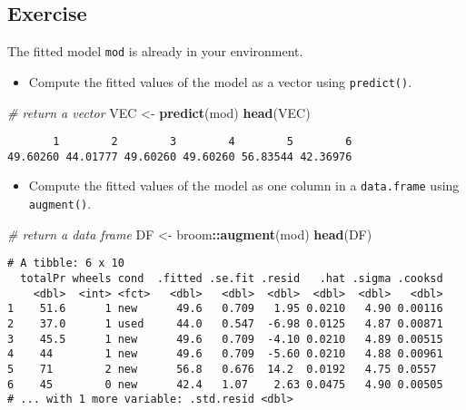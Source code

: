 \documentclass[]{book}
\newenvironment{Shaded}{\begin{snugshade}}{\end{snugshade}}
\newcommand{\KeywordTok}[1]{\textcolor[rgb]{0.13,0.29,0.53}{\textbf{#1}}}
\newcommand{\StringTok}[1]{\textcolor[rgb]{0.31,0.60,0.02}{#1}}
\newcommand{\CommentTok}[1]{\textcolor[rgb]{0.56,0.35,0.01}{\textit{#1}}}
\newcommand{\OperatorTok}[1]{\textcolor[rgb]{0.81,0.36,0.00}{\textbf{#1}}}
\newcommand{\NormalTok}[1]{#1}
\providecommand{\tightlist}{%
  \setlength{\itemsep}{0pt}\setlength{\parskip}{0pt}}
\begin{document}
\subsection*{Exercise}\label{exercise-5}

The fitted model \texttt{mod} is already in your environment.

\begin{itemize}
\tightlist
\item
  Compute the fitted values of the model as a vector using
  \texttt{predict()}.
\end{itemize}

\begin{Shaded}
\begin{Highlighting}[]
\CommentTok{# return a vector}
\NormalTok{VEC <-}\StringTok{ }\KeywordTok{predict}\NormalTok{(mod)}
\KeywordTok{head}\NormalTok{(VEC)}
\end{Highlighting}
\end{Shaded}

\begin{verbatim}
       1        2        3        4        5        6 
49.60260 44.01777 49.60260 49.60260 56.83544 42.36976 
\end{verbatim}

\begin{itemize}
\tightlist
\item
  Compute the fitted values of the model as one column in a
  \texttt{data.frame} using \texttt{augment()}.
\end{itemize}

\begin{Shaded}
\begin{Highlighting}[]
\CommentTok{# return a data frame}
\NormalTok{DF <-}\StringTok{ }\NormalTok{broom}\OperatorTok{::}\KeywordTok{augment}\NormalTok{(mod)}
\KeywordTok{head}\NormalTok{(DF)}
\end{Highlighting}
\end{Shaded}

\begin{verbatim}
# A tibble: 6 x 10
  totalPr wheels cond  .fitted .se.fit .resid   .hat .sigma .cooksd
    <dbl>  <int> <fct>   <dbl>   <dbl>  <dbl>  <dbl>  <dbl>   <dbl>
1    51.6      1 new      49.6   0.709   1.95 0.0210   4.90 0.00116
2    37.0      1 used     44.0   0.547  -6.98 0.0125   4.87 0.00871
3    45.5      1 new      49.6   0.709  -4.10 0.0210   4.89 0.00515
4    44        1 new      49.6   0.709  -5.60 0.0210   4.88 0.00961
5    71        2 new      56.8   0.676  14.2  0.0192   4.75 0.0557 
6    45        0 new      42.4   1.07    2.63 0.0475   4.90 0.00505
# ... with 1 more variable: .std.resid <dbl>
\end{verbatim}
\end{document}
